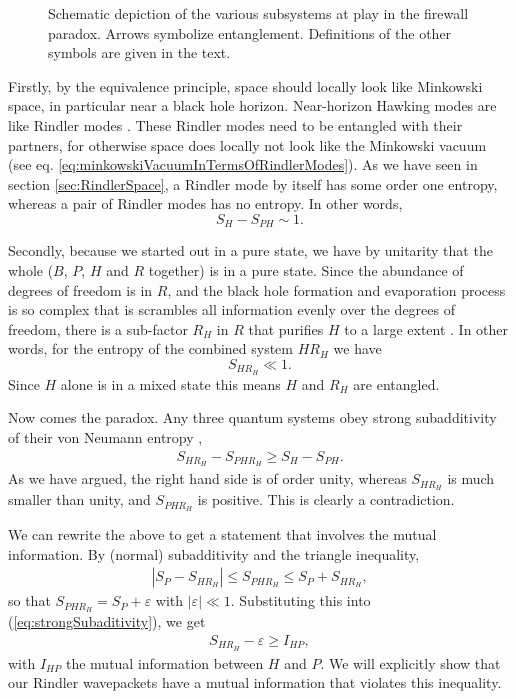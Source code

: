 \documentclass[11pt, a4paper]{article}
\newcommand{\ep}{\varepsilon}
\begin{document}
\begin{figure}[h]
	\centering
	\def\svgwidth{1\textwidth}
	\caption{Schematic depiction of the various subsystems at play in the firewall paradox. Arrows symbolize entanglement. Definitions of the other symbols are given in the text. \label{fig:firewallParadox}}
\end{figure}

Firstly, by the equivalence principle, space should locally look like Minkowski space, in particular near a black hole horizon. Near-horizon Hawking modes are like Rindler modes \cite{AMPS, Harlow, Susskind}. These Rindler modes need to be entangled with their partners, for otherwise space does locally not look like the Minkowski vacuum (see eq. \ref{eq:minkowskiVacuumInTermsOfRindlerModes}). As we have seen in section \ref{sec:RindlerSpace}, a Rindler mode by itself has some order one entropy, whereas a pair of Rindler modes has no entropy. In other words, 
\begin{equation*}
	S_H-S_{PH}\sim 1.
\end{equation*}

Secondly, because we started out in a pure state, we have by unitarity that the whole ($B$, $P$, $H$ and $R$ together) is in a pure state. Since the abundance of degrees of freedom is in $R$, and the black hole formation and evaporation process is so complex that is scrambles all information evenly over the degrees of freedom, there is a sub-factor $R_H$ in $R$ that purifies $H$ to a large extent \cite{Page}. In other words, for the entropy of the combined system $HR_H$ we have
\begin{equation}
S_{HR_H}\ll 1.
\end{equation}
Since $H$ alone is in a mixed state this means $H$ and $R_H$ are entangled.

Now comes the paradox. Any three quantum systems obey strong subadditivity of their von Neumann entropy \cite{Lieb},
 \begin{align}
 	\label{eq:strongSubaditivity}
 	S_{H{R_H}}-S_{PH{R_H}}\geq S_H-S_{PH}.
 \end{align}
 As we have argued, the right hand side is of order unity, whereas $S_{HR_{H}}$ is much smaller than unity, and $S_{PHR_{H}}$ is positive. This is clearly a contradiction. 

We can rewrite the above to get a statement that involves the mutual information. By (normal) subadditivity and the triangle inequality, 
\begin{align*}
	|S_P-S_{HR_H}|\leq S_{PHR_H}\leq S_P+S_{HR_H},
\end{align*}
so that  $S_{PHR_H}=S_P+\ep$ with $|\ep|\ll 1$. Substituting this into (\ref{eq:strongSubaditivity}), we get
\begin{align}
\label{eq:unitarity}
	S_{HR_H}-\ep\geq I_{HP},
\end{align}
with $I_{HP}$ the mutual information between $H$ and $P$. We will explicitly show that our Rindler wavepackets have a mutual information that violates this inequality.  
\end{document}
